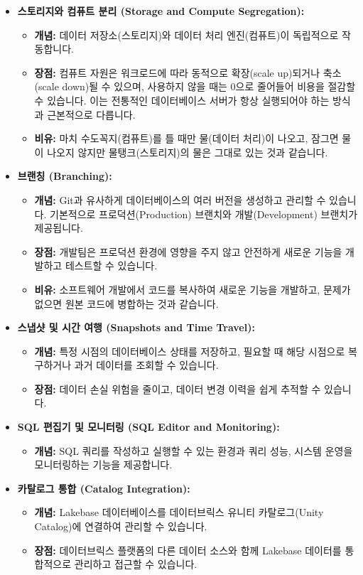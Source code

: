 \documentclass[11pt,a4paper]{article}
\begin{document}
\begin{itemize}
    \item \textbf{스토리지와 컴퓨트 분리 (Storage and Compute Segregation):}
    \begin{itemize}
        \item \textbf{개념:} 데이터 저장소(스토리지)와 데이터 처리 엔진(컴퓨트)이 독립적으로 작동합니다.
        \item \textbf{장점:} 컴퓨트 자원은 워크로드에 따라 동적으로 확장(scale up)되거나 축소(scale down)될 수 있으며, 사용하지 않을 때는 0으로 줄어들어 비용을 절감할 수 있습니다. 이는 전통적인 데이터베이스 서버가 항상 실행되어야 하는 방식과 근본적으로 다릅니다.
        \item \textbf{비유:} 마치 수도꼭지(컴퓨트)를 틀 때만 물(데이터 처리)이 나오고, 잠그면 물이 나오지 않지만 물탱크(스토리지)의 물은 그대로 있는 것과 같습니다.
    \end{itemize}
    \item \textbf{브랜칭 (Branching):}
    \begin{itemize}
        \item \textbf{개념:} Git과 유사하게 데이터베이스의 여러 버전을 생성하고 관리할 수 있습니다. 기본적으로 프로덕션(Production) 브랜치와 개발(Development) 브랜치가 제공됩니다.
        \item \textbf{장점:} 개발팀은 프로덕션 환경에 영향을 주지 않고 안전하게 새로운 기능을 개발하고 테스트할 수 있습니다.
        \item \textbf{비유:} 소프트웨어 개발에서 코드를 복사하여 새로운 기능을 개발하고, 문제가 없으면 원본 코드에 병합하는 것과 같습니다.
    \end{itemize}
    \item \textbf{스냅샷 및 시간 여행 (Snapshots and Time Travel):}
    \begin{itemize}
        \item \textbf{개념:} 특정 시점의 데이터베이스 상태를 저장하고, 필요할 때 해당 시점으로 복구하거나 과거 데이터를 조회할 수 있습니다.
        \item \textbf{장점:} 데이터 손실 위험을 줄이고, 데이터 변경 이력을 쉽게 추적할 수 있습니다.
    \end{itemize}
    \item \textbf{SQL 편집기 및 모니터링 (SQL Editor and Monitoring):}
    \begin{itemize}
        \item \textbf{개념:} SQL 쿼리를 작성하고 실행할 수 있는 환경과 쿼리 성능, 시스템 운영을 모니터링하는 기능을 제공합니다.
    \end{itemize}
    \item \textbf{카탈로그 통합 (Catalog Integration):}
    \begin{itemize}
        \item \textbf{개념:} Lakebase 데이터베이스를 데이터브릭스 유니티 카탈로그(Unity Catalog)에 연결하여 관리할 수 있습니다.
        \item \textbf{장점:} 데이터브릭스 플랫폼의 다른 데이터 소스와 함께 Lakebase 데이터를 통합적으로 관리하고 접근할 수 있습니다.
    \end{itemize}
\end{itemize}
\end{document}

